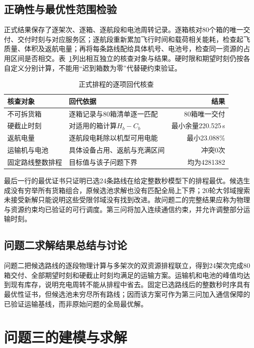 \documentclass[bwprint,fontset=fandol]{gmcmthesis}
\begin{document}
\subsection{正确性与最优性范围检验}
正式结果保存了逐架次、逐箱、逐航段和电池周转记录。逐箱核对80个箱的唯一交付、交付时刻与对应服务区；逐航段重新累加飞行时间和载荷相关能耗，检查起飞质量、体积及返航电量；再将每条路线配给具体机号、电池号，检查同一资源的占用区间是否相交。表~\ref{tab:q2-audit}列出相互独立的核查对象与结果。硬时限和期望时刻仍按各自定义分别计算，不能用“迟到箱数为零”代替硬约束验证。
\begin{table}[htbp]
\centering\small
\caption{正式排程的逐项回代核查}
\label{tab:q2-audit}
\begin{tabular}{@{}p{}p{}r@{}}
\toprule
核查对象 & 回代依据 & 结果\\
\midrule
不可拆货箱 & 逐箱记录与80箱清单逐一匹配 & 80箱唯一交付\\
硬截止时刻 & 对适用的箱计算$H_b-C_b$ & 最小余量220.525\,s\\
返航电量 & 逐航段电耗除以机型可用电能 & 最小23.088\%\\
运输机与电池 & 具体设备占用、返航与充满区间 & 冲突0次\\
固定路线整数排程 & 目标值与该子问题下界 & 均为4281382\\
\bottomrule
\end{tabular}
\end{table}

最后一行的最优证书只证明已选24条路线在给定整数秒模型下的排程最优。候选生成没有穷举所有货箱组合，原候选池求解也没有匹配全局上下界；20轮大邻域搜索未接受新解只能说明这些受限邻域没有找到改进。故问题二的完整结果应称为物理与资源约束均已验证的可行调度。第三问将加入连续通信约束，并允许调整部分运输时刻。

\subsection{问题二求解结果总结与讨论}
问题二把候选路线的逐段物理计算与多架次的双资源排程联立，得到24架次完成80箱交付、全部期望时刻和硬截止时刻均满足的运输方案。运输机和电池的峰值均达到现有库存，说明充电周转不能从排程中省去。固定已选路线后的整数秒时序具有最优性证书，但候选池未穷尽所有路线；因而该方案可作为第三问加入通信保障的已验证运输基线，而非原始问题的全局最优解。


\section{问题三的建模与求解}
\end{document}
